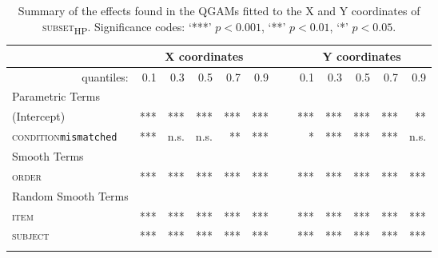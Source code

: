\begin{table}\fontsize{9}{10}
\caption{Summary of the effects found in the QGAMs fitted to the X and Y coordinates of \textsc{subset\textsubscript{HP}}. Significance codes: `***' $p < 0.001$, `**' $p < 0.01$, `*' $p < 0.05$.}
\label{tab:8.7}
\centering
\begin{tabular}{lrrrrrrrrrrr}
\lsptoprule
~                   & \multicolumn{5}{c}{X coordinates}       & \multicolumn{1}{c}{}                       & \multicolumn{5}{c}{Y coordinates}                               \\
\midrule
\multicolumn{1}{r}{quantiles:}          & 0.1        & 0.3        & 0.5        & 0.7        & 0.9 & ~       & 0.1        & 0.3        & 0.5        & 0.7        & 0.9         \\
\midrule
Parametric Terms    & \textbf{~} & \textbf{~} & \textbf{~} & \textbf{~} & \textbf{~} & \textbf{~} & \textbf{~} & \textbf{~} & \textbf{~} & \textbf{~}  \\
\midrule
(Intercept)         & ***        & ***        & ***        & ***        & *** & ~       & ***        & ***        & ***        & ***        & **          \\
\textsc{condition}\texttt{mismatched} & ***       & n.s.          & n.s.        & **        & ***  & ~      & *       & ***        & ***        & ***        & n.s.         \\
\midrule
Smooth Terms        & \textbf{~} & \textbf{~} & \textbf{~} & \textbf{~} & \textbf{~} & \textbf{~} & \textbf{~} & \textbf{~} & \textbf{~} & \textbf{~}  \\
\midrule
\textsc{order}               & ***        & ***        & ***        & ***        & ***   & ~     & ***        & ***        & ***        & ***        & ***         \\
\midrule
Random Smooth Terms & \textbf{~} & \textbf{~} & \textbf{~} & \textbf{~} & \textbf{~} & \textbf{~} & \textbf{~} & \textbf{~} & \textbf{~} & \textbf{~}  \\
\midrule
\textsc{item}                & ***        & ***        & ***        & ***        & ***  & ~      & ***        & ***        & ***        & ***        & ***         \\
\textsc{subject}             & ***        & ***        & ***        & ***        & ***  & ~      & ***        & ***        & ***        & ***        & ***        \\
\lspbottomrule
\end{tabular}
\end{table}


